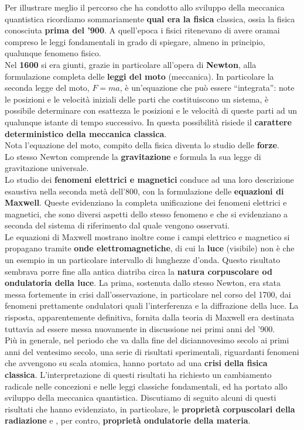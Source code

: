 Per illustrare meglio il percorso che ha condotto allo sviluppo della meccanica quantistica ricordiamo sommariamente \textbf{qual era la fisica} classica, ossia la fisica conosciuta \textbf{prima del '900}.  A quell'epoca i fisici ritenevano di avere oramai compreso le leggi fondamentali in grado di spiegare, almeno in principio, qualunque fenomeno fisico.\\
Nel \textbf{1600} si era giunti, grazie in particolare all'opera di \textbf{Newton}, alla formulazione completa delle \textbf{leggi del moto} (meccanica). In particolare la seconda legge del moto, $F=ma$, è un'equazione che può essere ``integrata'': note le posizioni e le velocità iniziali delle parti che costituiscono un sistema, è possibile determinare con esattezza le posizioni e le velocità di queste parti ad un qualunque istante di tempo successivo. In questa possibilità risiede il \textbf{carattere deterministico della meccanica classica}.\\
Nota l'equazione del moto, compito della fisica diventa lo studio delle \textbf{forze}.\\
Lo stesso Newton comprende la \textbf{gravitazione} e formula la sua legge di gravitazione universale.\\
Lo studio dei \textbf{fenomeni elettrici e magnetici} conduce ad una loro descrizione esaustiva nella seconda metà dell'800, con la formulazione delle \textbf{equazioni di Maxwell}. Queste evidenziano la completa unificazione dei fenomeni elettrici e magnetici, che sono diversi aspetti dello stesso fenomeno e che si evidenziano a seconda del sistema di riferimento dal quale vengono osservati.\\

Le equazioni di Maxwell mostrano inoltre come i campi elettrico e magnetico si propagano tramite \textbf{onde elettromagnetiche}, di cui la \textbf{luce} (visibile) non è che un esempio in un particolare intervallo di lunghezze d'onda. Questo risultato sembrava porre fine alla antica diatriba circa la \textbf{natura corpuscolare od ondulatoria della luce}. La prima, sostenuta dallo stesso Newton, era stata messa fortemente in crisi dall'osservazione, in particolare nel corso del 1700, dai fenomeni prettamente ondulatori quali l'interferenza e la diffrazione della luce. La risposta, apparentemente definitiva, fornita dalla teoria di Maxwell era destinata tuttavia ad essere messa nuovamente in discussione nei primi anni del '900.\\

Più in generale, nel periodo che va dalla fine del diciannovesimo secolo ai primi anni del ventesimo secolo, una serie di risultati sperimentali, riguardanti fenomeni che avvengono su scala atomica, hanno portato ad una \textbf{crisi della fisica classica}. L'interpretazione di questi risultati ha richiesto un cambiamento radicale nelle concezioni e nelle leggi classiche fondamentali, ed ha portato allo sviluppo della meccanica quantistica. Discutiamo di seguito alcuni di questi risultati che hanno evidenziato, in particolare, le \textbf{proprietà corpuscolari della radiazione} e , per contro, \textbf{proprietà ondulatorie della materia}.

